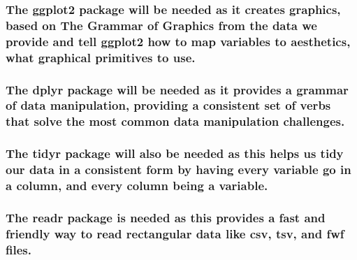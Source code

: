 \documentclass[
]{article}
\begin{document}
\hypertarget{the-ggplot2-package-will-be-needed-as-it-creates-graphics-based-on-the-grammar-of-graphics-from-the-data-we-provide-and-tell-ggplot2-how-to-map-variables-to-aesthetics-what-graphical-primitives-to-use.}{%
\subsubsection{The ggplot2 package will be needed as it creates
graphics, based on The Grammar of Graphics from the data we provide and
tell ggplot2 how to map variables to aesthetics, what graphical
primitives to
use.}\label{the-ggplot2-package-will-be-needed-as-it-creates-graphics-based-on-the-grammar-of-graphics-from-the-data-we-provide-and-tell-ggplot2-how-to-map-variables-to-aesthetics-what-graphical-primitives-to-use.}}

\hypertarget{the-dplyr-package-will-be-needed-as-it-provides-a-grammar-of-data-manipulation-providing-a-consistent-set-of-verbs-that-solve-the-most-common-data-manipulation-challenges.}{%
\subsubsection{The dplyr package will be needed as it provides a grammar
of data manipulation, providing a consistent set of verbs that solve the
most common data manipulation
challenges.}\label{the-dplyr-package-will-be-needed-as-it-provides-a-grammar-of-data-manipulation-providing-a-consistent-set-of-verbs-that-solve-the-most-common-data-manipulation-challenges.}}

\hypertarget{the-tidyr-package-will-also-be-needed-as-this-helps-us-tidy-our-data-in-a-consistent-form-by-having-every-variable-go-in-a-column-and-every-column-being-a-variable.}{%
\subsubsection{The tidyr package will also be needed as this helps us
tidy our data in a consistent form by having every variable go in a
column, and every column being a
variable.}\label{the-tidyr-package-will-also-be-needed-as-this-helps-us-tidy-our-data-in-a-consistent-form-by-having-every-variable-go-in-a-column-and-every-column-being-a-variable.}}

\hypertarget{the-readr-package-is-needed-as-this-provides-a-fast-and-friendly-way-to-read-rectangular-data-like-csv-tsv-and-fwf-files.}{%
\subsubsection{The readr package is needed as this provides a fast and
friendly way to read rectangular data like csv, tsv, and fwf
files.}\label{the-readr-package-is-needed-as-this-provides-a-fast-and-friendly-way-to-read-rectangular-data-like-csv-tsv-and-fwf-files.}}
\end{document}
